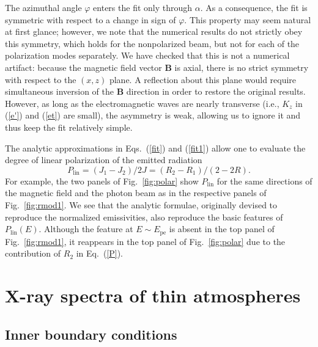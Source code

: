 \documentclass{aa}
\newcommand{\beq}{\begin{equation}}
\newcommand{\eeq}{\end{equation}}
\newcommand{\req}[1]{Eq.~(\ref{#1})}
\newcommand{\Epe}{E_\mathrm{pe}}
\begin{document}
The azimuthal angle $\varphi$ enters the fit only
through $\alpha$. As a consequence, the fit is symmetric with
respect to a change in sign of $\varphi$. This property
may seem natural at first glance; however, we note that
the numerical results do not strictly obey this symmetry, which
holds for the nonpolarized beam, but not for each of the
polarization modes separately. We have checked that this is not a numerical
artifact: because the magnetic field vector $\bm{B}$ is
axial, there is no strict symmetry with respect to the
$(x,z)$ plane. A reflection about this plane would require 
simultaneous inversion of the $\bm{B}$ direction in order
to restore the original results. However, as long as the
electromagnetic waves are nearly transverse (i.e., $K_z$ in
(\ref{e'}) and (\ref{et}) are small), the asymmetry is weak,
allowing us to ignore it and thus keep the fit
relatively simple.

The analytic approximations in Eqs.~(\ref{fit}) and (\ref{fit1}) 
allow one to evaluate the degree of linear polarization of the emitted
radiation 
\beq
   P_\mathrm{lin} = (J_1-J_2)/2J = (R_2-R_1)/(2-2R).
\label{P}
\eeq
For example, the two panels of Fig.~\ref{fig:polar} show
$P_\mathrm{lin}$ for 
the same directions of the magnetic field and the photon beam
as in the respective panels of Fig.~\ref{fig:rmod1}.
We see that the analytic formulae, originally devised to
reproduce the normalized emissivities, also reproduce 
the basic features of $P_\mathrm{lin}(E)$. Although the feature
at $E\sim\Epe$ is absent in the top panel of
Fig.~\ref{fig:rmod1}, it reappears in the top panel of
Fig.~\ref{fig:polar} due to the contribution of $R_2$ in \req{P}.

\section{X-ray spectra of thin atmospheres}
\label{sect:atm}

\subsection{Inner boundary conditions}
\label{sect:inner}
\end{document}
